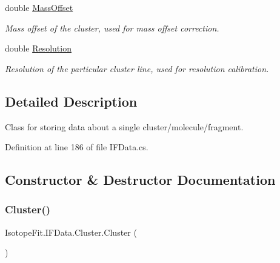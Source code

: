 \begin{DoxyCompactItemize}
double \mbox{\hyperlink{class_isotope_fit_1_1_i_f_data_1_1_cluster_afa64046ba8bdad51edc7ca5c1c39cd8c}{Mass\+Offset}}
\begin{DoxyCompactList}\small\item\em Mass offset of the cluster, used for mass offset correction. \end{DoxyCompactList}\item 
double \mbox{\hyperlink{class_isotope_fit_1_1_i_f_data_1_1_cluster_ad98e129dd08bfd98df4b474b4c9139f8}{Resolution}}
\begin{DoxyCompactList}\small\item\em Resolution of the particular cluster line, used for resolution calibration. \end{DoxyCompactList}\end{DoxyCompactItemize}


\subsection{Detailed Description}
Class for storing data about a single cluster/molecule/fragment. 



Definition at line 186 of file I\+F\+Data.\+cs.



\subsection{Constructor \& Destructor Documentation}
\mbox{\label{class_isotope_fit_1_1_i_f_data_1_1_cluster_ada019f0710b46fddad5f74a541deb4da}} 
\subsubsection{\texorpdfstring{Cluster()}{Cluster()}}
{\footnotesize\ttfamily Isotope\+Fit.\+I\+F\+Data.\+Cluster.\+Cluster (\begin{DoxyParamCaption}{ }\end{DoxyParamCaption})}




